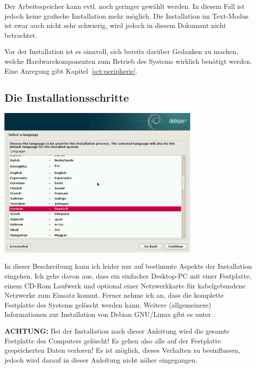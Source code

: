 \documentclass[a4paper,12pt,twoside]{article}
\begin{document}
Der Arbeitsspeicher kann evtl. noch geringer gewählt werden. In diesem
Fall ist jedoch keine grafische Installation mehr möglich. Die
Installation im Text-Modus ist zwar auch nicht sehr schwierig, wird
jedoch in diesem Dokument nicht betrachtet.

Vor der Installation ist es sinnvoll, sich bereits darüber Gedanken zu
machen, welche Hardwarekomponenten zum Betrieb des Systems wirklich
benötigt werden. Eine Anregung gibt Kapitel~\ref{sct:peripherie}.


\subsection{Die Installationsschritte}
\label{sct:inst_schritte}

\begin{minipage}{\linewidth}
    \centering
    \captionsetup{type=figure}
    \includegraphics[width=10cm]{screenshots/select_language.png}
    \label{fig:inst_sprache}
\end{minipage}

\bigskip
In dieser Beschreibung kann ich leider nur auf bestimmte Aspekte der
Installation eingehen. Ich gehe davon aus, dass ein einfacher
Desktop-PC mit einer Festplatte, einem CD-Rom Laufwerk und optional
einer Netzwerkkarte für kabelgebundene Netzwerke zum Einsatz kommt.
Ferner nehme ich an, dass die komplette Festplatte des Systems gelöscht
werden kann. Weitere (allgemeinere) Informationen zur Installation von
Debian GNU/Linux gibt es unter \cite{DEB2}.

\textbf{ACHTUNG:} Bei der Installation nach dieser Anleitung wird die gesamte
Festplatte des Computers gelöscht! Es gehen also alle auf der
Festplatte gespeicherten Daten verloren! Es ist möglich, dieses
Verhalten zu beeinflussen, jedoch wird darauf in dieser Anleitung nicht
näher eingegangen.
\end{document}
